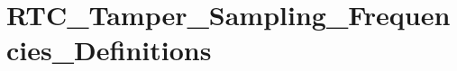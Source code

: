 \hypertarget{group___r_t_c___tamper___sampling___frequencies___definitions}{\section{R\-T\-C\-\_\-\-Tamper\-\_\-\-Sampling\-\_\-\-Frequencies\-\_\-\-Definitions}
\label{group___r_t_c___tamper___sampling___frequencies___definitions}
}
